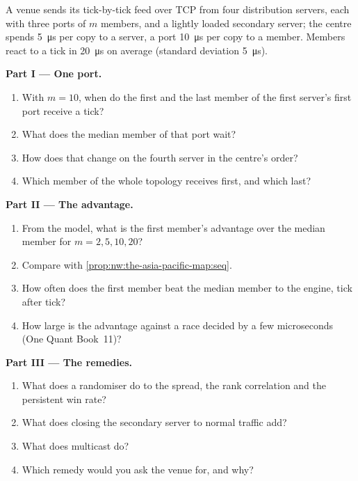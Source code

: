 \begin{problem}\label{pb:nw:the-asia-pacific-map:1}
A venue sends its tick-by-tick feed over TCP from four distribution servers, each with three ports of $m$ members, and a lightly loaded
secondary server; the centre spends \qty{5}{\micro\second} per copy to a server, a port \qty{10}{\micro\second} per copy to a member. Members react
to a tick in \qty{20}{\micro\second} on average (standard deviation \qty{5}{\micro\second}).

\medskip\noindent\textbf{Part I --- One port.}
\begin{enumerate}
\item With $m = 10$, when do the first and the last member of the first server's first port receive a tick?
\item What does the median member of that port wait?
\item How does that change on the fourth server in the centre's order?
\item Which member of the whole topology receives first, and which last?
\end{enumerate}

\medskip\noindent\textbf{Part II --- The advantage.}
\begin{enumerate}[resume]
\item From the model, what is the first member's advantage over the median member for $m = 2, 5, 10, 20$?
\item Compare with \cref{prop:nw:the-asia-pacific-map:seq}.
\item How often does the first member beat the median member to the engine, tick after tick?
\item How large is the advantage against a race decided by a few microseconds (One Quant Book~11)?
\end{enumerate}

\medskip\noindent\textbf{Part III --- The remedies.}
\begin{enumerate}[resume]
\item What does a randomiser do to the spread, the rank correlation and the persistent win rate?
\item What does closing the secondary server to normal traffic add?
\item What does multicast do?
\item Which remedy would you ask the venue for, and why?
\end{enumerate}


\end{problem}
